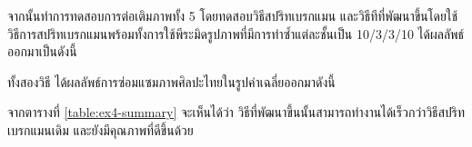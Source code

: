 


\hspace{1cm} จากนั้นทำการทดสอบการต่อเติมภาพทั้ง 5 โดยทดสอบวิธีสปริทเบรกแมน และวิธีทีที่พัฒนาขึ้นโดยใช้วิธีการสปริทเบรกแมนพร้อมทั้งการใช้พีระมิดรูปภาพที่มีการทำซ้ำแต่ละชั้นเป็น 10/3/3/10  ได้ผลลัพธ์ออกมาเป็นดังนี้







\hspace{1cm}ทั้งสองวิธี ได้ผลลัพธ์การซ่อมแซมภาพศิลปะไทยในรูปค่าเฉลี่ยออกมาดังนี้



\hspace{1cm} จากตารางที่ \ref{table:ex4-summary} จะเห็นได้ว่า วิธีที่พัฒนาขึ้นนั้นสามารถทำงานได้เร็วกว่าวิธีสปริทเบรกแมนเดิม และยังมีคุณภาพที่ดีขึ้นด้วย

